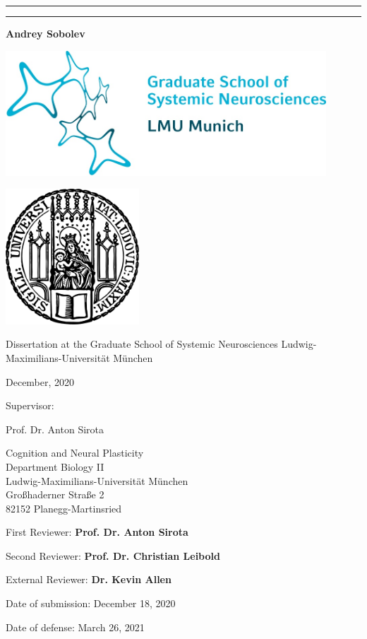 \begin{titlepage}
	\centering

  \noindent\rule{15cm}{0.4pt}
  {\linespread{1.5}{\Huge Contribution of the idiothetic and the allothetic information to the hippocampal place code\par}}
  \noindent\rule{15cm}{0.4pt}

  {\LARGE \bfseries Andrey Sobolev}

  \includegraphics[width=120mm]{assets/gsn.jpg}

  \includegraphics[width=50mm]{assets/lmu-logo.png}

  Dissertation at the
  Graduate School of Systemic Neurosciences
	Ludwig-Maximilians-Universität München

  December, 2020

  \vfill

	\begin{flushleft}
	{\large Supervisor:}

	{\LARGE Prof. Dr. Anton Sirota\par}
    Cognition and Neural Plasticity\\
    Department Biology II\\
    Ludwig-Maximilians-Universität München\\
    Großhaderner Straße 2\\
    82152 Planegg-Martinsried

	\vspace{1in}

	{\large First Reviewer:     \bfseries Prof. Dr. Anton Sirota\par}
	{\large Second Reviewer:    \bfseries Prof. Dr. Christian Leibold\par}
	{\large External Reviewer:  \bfseries Dr. Kevin Allen\par}

  \vspace{1in}

	{\large Date of submission: December 18, 2020\par}
	{\large Date of defense: March 26, 2021\par}
	\end{flushleft}

\end{titlepage}

